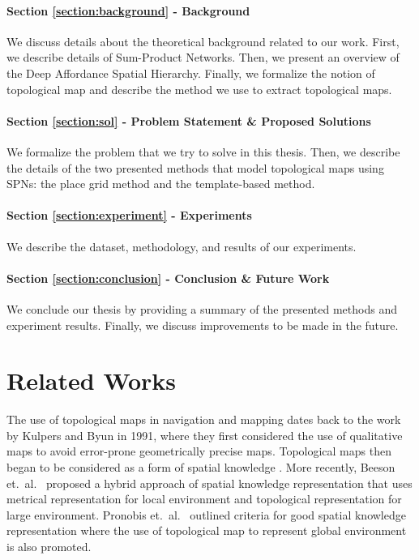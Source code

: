 \documentclass[10pt, titlepage]{article}
\theoremstyle{definition}
\begin{document}
\paragraph{Section \ref{section:background} - Background} We discuss details about the theoretical background related to our work. First, we describe details of Sum-Product Networks. Then, we present an overview of the Deep Affordance Spatial Hierarchy. Finally, we formalize the notion of topological map and describe the method we use to extract topological maps.

\paragraph{Section \ref{section:sol} - Problem Statement \& Proposed Solutions} We formalize the problem that we try to solve in this thesis. Then, we describe the details of the two presented methods that model topological maps using SPNs: the place grid method and the template-based method.

\paragraph{Section \ref{section:experiment} - Experiments} We describe the dataset, methodology, and results of our experiments.

\paragraph{Section \ref{section:conclusion} - Conclusion \& Future Work} We conclude our thesis by providing a summary of the presented methods and experiment results. Finally, we discuss improvements to be made in the future.


\newpage
\section{Related Works}\label{section:related}

The use of topological maps in navigation and mapping dates back to the work by Kulpers and Byun \cite{kuipers1991robot} in 1991, where they first considered the use of qualitative maps to avoid error-prone geometrically precise maps. Topological maps then began to be considered as a form of spatial knowledge \cite{kuipers2000spatial}. More recently, Beeson et.~al.~\cite{beeson2010factoring} proposed a hybrid approach of spatial knowledge representation that uses metrical representation for local environment and topological representation for large environment. Pronobis et.~al.~\cite{pronobis2010representing} outlined criteria for good spatial knowledge representation where the use of topological map to represent global environment is also promoted.
\end{document}
